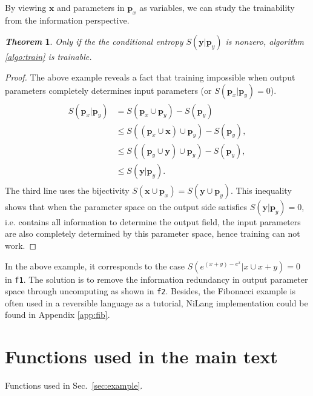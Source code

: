 \documentclass[aps,twocolumn,longbibliography,english,superscriptaddress]{revtex4-1}
\newcommand{\<}{\langle}
\renewcommand{\>}{\rangle}
\newcommand{\vx}{{\mathbf{x}}}
\newcommand{\vp}{{\mathbf{p}}}
\newcommand{\vy}{{\mathbf{y}}}
\newcommand{\Sec}[1]{Sec.~\ref{#1}}
\newcommand{\App}[1]{Appendix \ref{#1}}
\newtheorem{theorem}{\textit{Theorem}}
\theoremstyle{definition}\newtheorem{definition}{\textit{Definition}}
\begin{document}
By viewing $\vx$ and parameters in $\vp_x$ as variables, we can study the trainability from the information perspective.
\begin{theorem}
    Only if the the conditional entropy $S(\vy|\vp_y)$ is nonzero, algorithm \ref{algo:train} is trainable.
\end{theorem}
\begin{proof}
The above example reveals a fact that training impossible when output parameters completely determines input parameters (or $S(\vp_x | \vp_y) = 0$).
\begin{align}
    \begin{split}
        S(\vp_x | \vp_y) &= S(\vp_x \cup \vp_y) - S(\vp_y)\\
        &\leq S\left((\vp_x \cup \vx) \cup \vp_y \right) - S(\vp_y),\\
        &\leq S\left((\vp_y \cup \vy) \cup \vp_y\right) - S(\vp_y),\\
    &\leq S(\vy|\vp_y).
    \end{split}
\end{align}
The third line uses the bijectivity $S(\vx \cup \vp_x) = S(\vy \cup \vp_y)$.
This inequality shows that when the parameter space on the output side satisfies $S(\vy | \vp_y) = 0$, i.e. contains all information to determine the output field, the input parameters are also completely determined by this parameter space, hence training can not work.
\end{proof}
In the above example, it corresponds to the case $S\left(e^{(x+y)-e^x} | x \cup x + y\right) = 0$ in \texttt{f1}.
The solution is to remove the information redundancy in output parameter space through uncomputing as shown in \texttt{f2}.
Besides, the Fibonacci example is often used in a reversible language as a tutorial, NiLang implementation could be found in \App{app:fib}.

\section{Functions used in the main text}\label{app:functions}

Functions used in \Sec{sec:example}.
\end{document}

